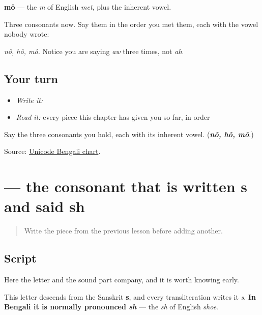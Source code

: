 \textbf{mô} — the \emph{m} of English \emph{met}, plus the inherent vowel.

Three consonants now. Say them in the order you met them, each with the vowel nobody wrote:

\begin{quote}
\textbf{}  \textbf{}  \textbf{}
\end{quote}

\emph{nô, hô, mô.} Notice you are saying \emph{aw} three times, not \emph{ah}.

\subsection*{Your turn}
\begin{itemize}
\raggedright
  \item \emph{Write it:} 
  \item \emph{Read it:} every piece this chapter has given you so far, in order
\end{itemize}

\begin{tcolorbox}[breakable,colback=teal!4,colframe=teal!35!black,title={Before you move on}]
Say the three consonants you hold, each with its inherent vowel. (\emph{\textbf{nô, hô, mô}}.)

Source: \href{https://www.unicode.org/charts/PDF/U0980.pdf}{Unicode Bengali chart}.
\end{tcolorbox}
\section[shô]{ — the consonant that is written s and said sh}

\label{lesson:BN-W01-sa}



\begin{quote}
Write the piece from the previous lesson before adding another.
\end{quote}

\subsection*{Script}
\begin{quote}
\end{quote}

Here the letter and the sound part company, and it is worth knowing early.

This letter descends from the Sanskrit \textbf{s}, and every transliteration writes it \emph{s}. \textbf{In Bengali it is normally pronounced \emph{sh}} — the \emph{sh} of English \emph{shoe}.

